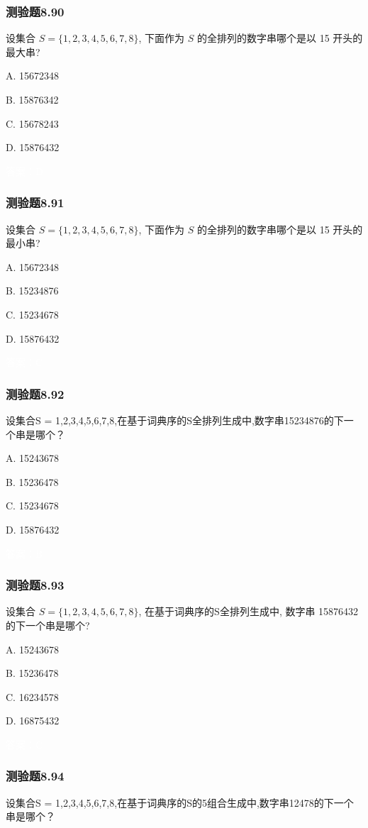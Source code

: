 \documentclass[UTF8, heading=true]{ctexart}
\begin{document}
\subsubsection{测验题8.90}

设集合 $S=\{1,2,3,4,5,6,7,8\}$, 下面作为 $S$ 的全排列的数字串哪个是以 15 开头的最大串?

A. 15672348

B. 15876342

C. 15678243

D. 15876432

\textcolor{white}{答案：D}

\subsubsection{测验题8.91}

设集合 $S=\{1,2,3,4,5,6,7,8\}$, 下面作为 $S$ 的全排列的数字串哪个是以 15 开头的最小串?

A. 15672348

B. 15234876

C. 15234678

D. 15876432

\textcolor{white}{答案：C}

\subsubsection{测验题8.92}

设集合S = {1,2,3,4,5,6,7,8},在基于词典序的S全排列生成中,数字串15234876的下一个串是哪个？

A. 15243678

B. 15236478

C. 15234678

D. 15876432

\textcolor{white}{答案：B}

\subsubsection{测验题8.93}

设集合 $S=\{1,2,3,4,5,6,7,8\}$, 在基于词典序的S全排列生成中, 数字串 15876432 的下一个串是哪个?

A. 15243678

B. 15236478

C. 16234578

D. 16875432

\textcolor{white}{答案：C}

\subsubsection{测验题8.94}
设集合S = {1,2,3,4,5,6,7,8},在基于词典序的S的5组合生成中,数字串12478的下一个串是哪个？
\end{document}
